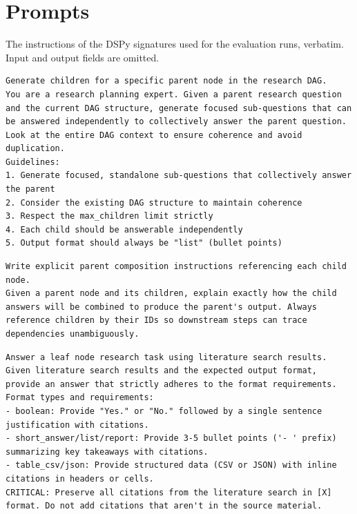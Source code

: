 \section{Prompts}
\label{app:prompts}
The instructions of the DSPy signatures used for the evaluation runs, verbatim. Input and output fields are omitted.

\begin{lstlisting}[title={LayerChildGenerationSignature (Phase 1, one layer of children)}]
Generate children for a specific parent node in the research DAG.
You are a research planning expert. Given a parent research question and the current DAG structure, generate focused sub-questions that can be answered independently to collectively answer the parent question. Look at the entire DAG context to ensure coherence and avoid duplication.
Guidelines:
1. Generate focused, standalone sub-questions that collectively answer the parent
2. Consider the existing DAG structure to maintain coherence
3. Respect the max_children limit strictly
4. Each child should be answerable independently
5. Output format should always be "list" (bullet points)
\end{lstlisting}

\begin{lstlisting}[title={CompositionInstructionSignature (Phase 1, per parent)}]
Write explicit parent composition instructions referencing each child node.
Given a parent node and its children, explain exactly how the child answers will be combined to produce the parent's output. Always reference children by their IDs so downstream steps can trace dependencies unambiguously.
\end{lstlisting}

\begin{lstlisting}[title={LeafNodeResearcher (Phase 2, leaves)}]
Answer a leaf node research task using literature search results.
Given literature search results and the expected output format, provide an answer that strictly adheres to the format requirements.
Format types and requirements:
- boolean: Provide "Yes." or "No." followed by a single sentence justification with citations.
- short_answer/list/report: Provide 3-5 bullet points ('- ' prefix) summarizing key takeaways with citations.
- table_csv/json: Provide structured data (CSV or JSON) with inline citations in headers or cells.
CRITICAL: Preserve all citations from the literature search in [X] format. Do not add citations that aren't in the source material.
\end{lstlisting}

